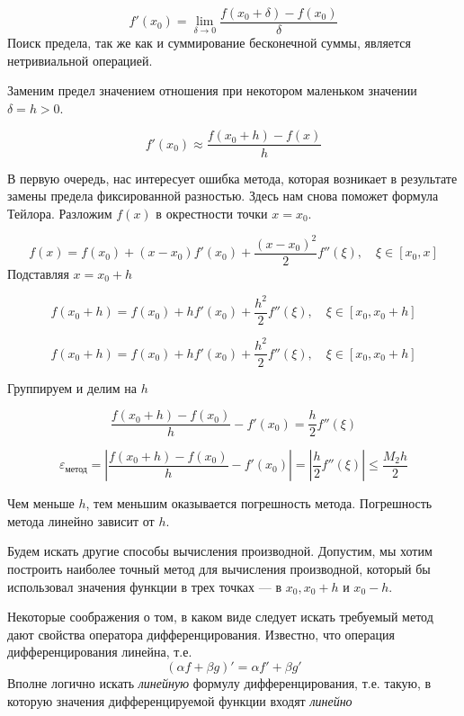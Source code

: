 \documentclass[professionalfonts,compress,unicode]{beamer}
\begin{document}
{
	$$
	f'(x_0) = \lim_{\delta \rightarrow 0} \frac{f(x_0+\delta) - f(x_0)}{\delta}
	$$
	Поиск предела, так же как и суммирование бесконечной суммы, является нетривиальной операцией.
	
	\pause
	Заменим предел значением отношения при некотором маленьком значении $\delta = h > 0$.
	
	$$
	f'(x_0) \approx \frac{f(x_0+h) - f(x)}{h}
	$$
}

{
	В первую очередь, нас интересует ошибка метода, которая возникает в результате замены предела 
	фиксированной разностью. Здесь нам снова поможет формула Тейлора. Разложим $f(x)$ в окрестности
	точки $x = x_0$.
	
	$$
	f(x) = f(x_0) + (x-x_0) f'(x_0) + \frac{(x-x_0)^2}{2} f''(\xi), \quad \xi \in [x_0,x]
	$$
	\pause
	Подставляя $x = x_0 + h$

	$$
	f(x_0 + h) = f(x_0) + h f'(x_0) + \frac{h^2}{2} f''(\xi), \quad \xi \in [x_0,x_0+h]
	$$
}

{
	$$
	f(x_0 + h) = f(x_0) + h f'(x_0) + \frac{h^2}{2} f''(\xi), \quad \xi \in [x_0,x_0+h]
	$$
	
	Группируем и делим на $h$
	
	$$
	\frac{f(x_0 + h) - f(x_0)}{h} - f'(x_0) = \frac{h}{2} f''(\xi)
	$$

	$$
	\varepsilon_{\text{метод}} = \left|\frac{f(x_0 + h) - f(x_0)}{h} - f'(x_0) \right| = \left |\frac{h}{2} f''(\xi) \right | \leq \frac{M_2 h}{2}
	$$
	
	Чем меньше $h$, тем меньшим оказывается погрешность метода. Погрешность метода линейно зависит от $h$. 
}

{
	Будем искать другие способы вычисления производной. Допустим, мы хотим построить наиболее 
	точный метод для вычисления производной, который бы использовал значения функции в трех точках --- 
	в $x_0, x_0+h$ и $x_0-h$.
	
	Некоторые соображения о том, в каком виде следует искать требуемый метод дают свойства оператора дифференцирования.
	Известно, что операция дифференцирования линейна, т.е.
	$$
	(\alpha f + \beta g)' = \alpha f' + \beta g'
	$$
	Вполне логично искать \emph{линейную} формулу дифференцирования, т.е. такую, в которую значения дифференцируемой функции входят 
	\emph{линейно}
}
\end{document}

